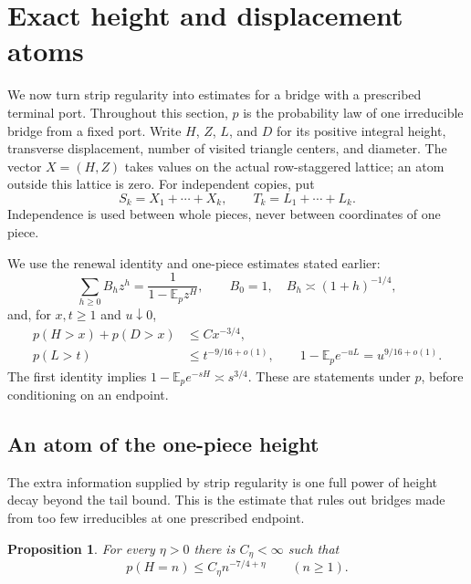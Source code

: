 \documentclass[11pt]{article}
\numberwithin{equation}{section}
\newtheorem{proposition}[theorem]{Proposition}
\theoremstyle{definition}\newtheorem{definition}[theorem]{Definition}
\theoremstyle{remark}\newtheorem{remark}[theorem]{Remark}
\begin{document}
\section{Exact height and displacement atoms}\label{c:atoms-section}

We now turn strip regularity into estimates for a bridge with a prescribed
terminal port.  Throughout this section, $p$ is the probability law of one
irreducible bridge from a fixed port.  Write $H$, $Z$, $L$, and $D$
for its positive integral height, transverse displacement, number of visited
triangle centers, and diameter.  The vector $X=(H,Z)$ takes values on the
actual row-staggered lattice; an atom outside this lattice is zero.  For
independent copies, put
\[
 S_k=X_1+\cdots+X_k,\qquad
 T_k=L_1+\cdots+L_k.
\]
Independence is used between whole pieces, never between coordinates of
one piece.

We use the renewal identity and one-piece estimates stated earlier:
\begin{equation}\label{c:renewal-atom-inputs}
 \sum_{h\ge0}B_hz^h=\frac1{1-\mathbb E_p z^H},\qquad
 B_0=1,\quad B_h\asymp(1+h)^{-1/4},
\end{equation}
and, for $x,t\ge1$ and $u\downarrow0$,
\begin{equation}\label{c:tail-atom-inputs}
 \begin{split}
 p(H>x)+p(D>x)&\le Cx^{-3/4},\\
 p(L>t)&\le t^{-9/16+o(1)},\qquad
 1-\mathbb E_p e^{-uL}=u^{9/16+o(1)}.
 \end{split}
\end{equation}
The first identity implies
$1-\mathbb E_p e^{-sH}\asymp s^{3/4}$.
These are statements under $p$, before conditioning on an endpoint.

\subsection{An atom of the one-piece height}

The extra information supplied by strip regularity is one full power of
height decay beyond the tail bound.  This is the estimate that rules out
bridges made from too few irreducibles at one prescribed endpoint.

\begin{proposition}\label{c:height-atom}
For every $\eta>0$ there is $C_\eta<\infty$ such that
\[
 p(H=n)\le C_\eta n^{-7/4+\eta}\qquad(n\ge1).
\]
\end{proposition}
\end{document}
